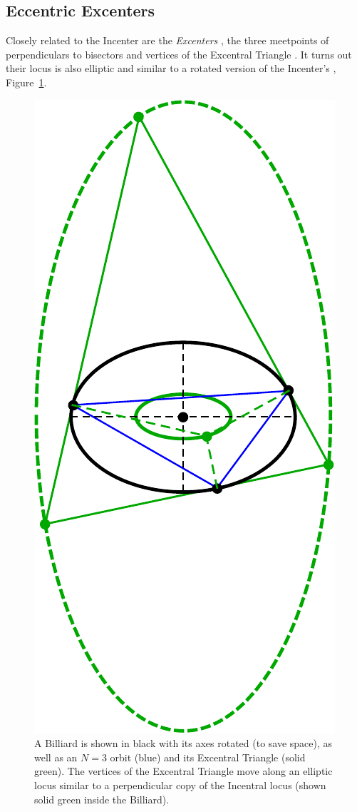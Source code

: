 \subsection{Eccentric Excenters}

Closely related to the Incenter are the {\em Excenters} \cite{mw}, the three meetpoints of perpendiculars to bisectors and vertices of the Excentral Triangle \cite{mw}. It turns out their locus is also elliptic and similar to a rotated version of the Incenter's  \cite{ronaldo19}, Figure~\ref{fig:locus-incenter-excenter}.
%

\begin{figure}[H]
    \centering
    \includegraphics[angle=90,width=.73\textwidth]{pics/0025_incenter_excenter_locus.pdf}
    \caption{A Billiard is shown in black with its axes rotated (to save space), as well as an $N=3$ orbit (blue) and its Excentral Triangle (solid green). The vertices of the Excentral Triangle move along an elliptic locus similar to a perpendicular copy of the Incentral locus (shown solid green inside the Billiard).}
    \label{fig:locus-incenter-excenter}
\end{figure}

